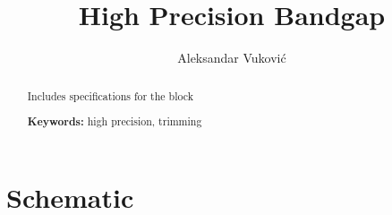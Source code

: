 \documentclass[12pt]{article}
\title{High Precision Bandgap}
\author[]{Aleksandar Vuković}
\date{}
\begin{document}
\maketitle

\begin{abstract}
    Includes specifications for the block

\textbf{Keywords:} high precision, trimming 
\end{abstract}

\section{Schematic} %





\end{document}
